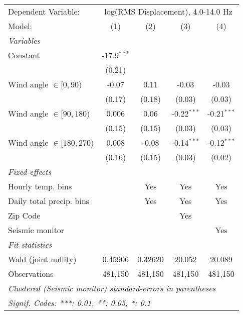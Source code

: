 
\begingroup
\centering
\begin{tabular}{lcccc}
   \tabularnewline \midrule \midrule
   Dependent Variable: & \multicolumn{4}{c}{log(RMS Displacement), 4.0-14.0 Hz}\\
   Model:                       & (1)           & (2)     & (3)           & (4)\\  
   \midrule
   \emph{Variables}\\
   Constant                     & -17.9$^{***}$ &         &               &   \\   
                                & (0.21)        &         &               &   \\   
   Wind angle $\in [0, 90)$     & -0.07         & 0.11    & -0.03         & -0.03\\   
                                & (0.17)        & (0.18)  & (0.03)        & (0.03)\\   
   Wind angle $\in [90, 180)$   & 0.006         & 0.06    & -0.22$^{***}$ & -0.21$^{***}$\\   
                                & (0.15)        & (0.15)  & (0.03)        & (0.03)\\   
   Wind angle $\in [180, 270)$  & 0.008         & -0.08   & -0.14$^{***}$ & -0.12$^{***}$\\   
                                & (0.16)        & (0.15)  & (0.03)        & (0.02)\\   
   \midrule
   \emph{Fixed-effects}\\
   Hourly temp. bins            &               & Yes     & Yes           & Yes\\  
   Daily total precip. bins     &               & Yes     & Yes           & Yes\\  
   Zip Code                     &               &         & Yes           & \\  
   Seismic monitor              &               &         &               & Yes\\  
   \midrule
   \emph{Fit statistics}\\
   Wald (joint nullity)         & 0.45906       & 0.32620 & 20.052        & 20.089\\  
   Observations                 & 481,150       & 481,150 & 481,150       & 481,150\\  
   \midrule \midrule
   \multicolumn{5}{l}{\emph{Clustered (Seismic monitor) standard-errors in parentheses}}\\
   \multicolumn{5}{l}{\emph{Signif. Codes: ***: 0.01, **: 0.05, *: 0.1}}\\
\end{tabular}
\par\endgroup


